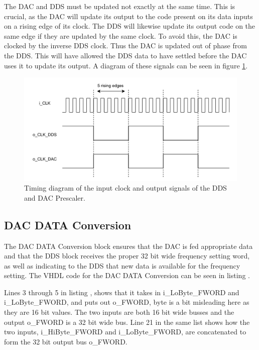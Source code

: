 The DAC and DDS must be updated not exactly at the same time. This is crucial, as the DAC will update its output to the code present on its data inputs on a rising edge of its clock. The DDS will likewise update its output code on the same edge if they are updated by the same clock. To avoid this, the DAC is clocked by the inverse DDS clock. Thus the DAC is updated  out of phase from the DDS. This will have allowed the DDS data to have settled before the DAC uses it to update its output. A diagram of these signals can be seen in figure \ref{fig:7_2_3_DAC_PRESCALER}.

\begin{figure}[H]
    \centering
    \includegraphics[clip, trim=0 0 0 0, width=1\textwidth]{Sections/7_SystemDesign/Figures/DAC_PRESCALER.pdf}
    \caption{Timing diagram of the input clock and output signals of the DDS and DAC Prescaler.}
    \label{fig:7_2_3_DAC_PRESCALER}
\end{figure}

\subsection*{DAC DATA Conversion}
The DAC DATA Conversion block ensures that the DAC is fed appropriate data and that the DDS block receives the proper 32 bit wide frequency setting word, as well as indicating to the DDS that new data is available for the frequency setting. The VHDL code for the DAC DATA Conversion can be seen in listing .



Lines 3 through 5 in listing , shows that it takes in i\_LoByte\_FWORD and i\_LoByte\_FWORD, and puts out o\_FWORD, byte is a bit misleading here as they are 16 bit values. The two inputs are both 16 bit wide busses and the output o\_FWORD is a 32 bit wide bus. Line 21 in the same list shows how the two inputs, i\_HiByte\_FWORD and i\_LoByte\_FWORD, are concatenated to form the 32 bit output bus o\_FWORD.

